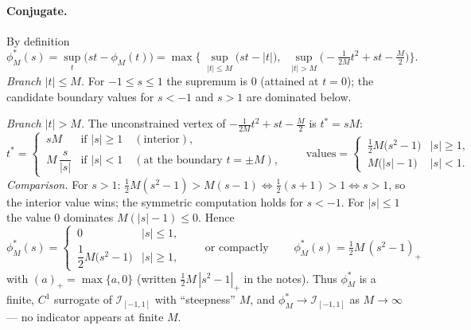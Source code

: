 \documentclass{article}
\newcommand{\pospart}[1]{\left(#1\right)_{+}}
\begin{document}
\paragraph{Conjugate.} By definition
$$
\phi_M^{*}(s)=\sup_t\big(st-\phi_M(t)\big)
=\max\Big\{\;\sup_{|t|\le M}\big(st-|t|\big),\;\;
\sup_{|t|> M}\big(-\tfrac{1}{2M}t^{2}+st-\tfrac{M}{2}\big)\Big\}.
$$
\emph{Branch $|t|\le M$.} For $-1\le s\le 1$ the supremum is $0$ (attained at $t=0$);
the candidate boundary values for $s<-1$ and $s>1$ are dominated below.

\emph{Branch $|t|> M$.} The unconstrained vertex of $-\tfrac{1}{2M}t^{2}+st-\tfrac{M}{2}$ is $t^{*}=sM$:
$$
t^{*}=
\begin{cases}
\,sM & \text{if } |s|\ge 1 \quad(\text{interior}),\\[2pt]
\,M\,\dfrac{s}{|s|} & \text{if } |s|< 1 \quad(\text{at the boundary } t=\pm M),
\end{cases}
\qquad
\text{values}=
\begin{cases}
\,\tfrac{1}{2}M\big(s^{2}-1\big) & |s|\ge 1,\\[4pt]
\,M\big(|s|-1\big) & |s|< 1.
\end{cases}
$$
\emph{Comparison.} For $s>1$: $\tfrac{1}{2}M(s^{2}-1)>M(s-1)\iff \tfrac{1}{2}(s+1)>1\iff s>1$, so the interior value wins;
the symmetric computation holds for $s<-1$. For $|s|\le 1$ the value $0$ dominates $M(|s|-1)\le 0$. Hence
$$
\phi_M^{*}(s)=
\begin{cases}
\,0 & |s|\le 1,\\[4pt]
\,\dfrac{1}{2}M\big(s^{2}-1\big) & |s|\ge 1,
\end{cases}
\qquad\text{or compactly}\qquad
\boxed{\;\phi_M^{*}(s)=\tfrac{1}{2}M\,\pospart{s^{2}-1}\;}
$$
with $\pospart{a}=\max\{a,0\}$ (written $\tfrac{1}{2}M\,|s^{2}-1|_{+}$ in the notes).
Thus $\phi_M^{*}$ is a finite, $C^{1}$ surrogate of $\mathcal{I}_{[-1,1]}$ with ``steepness'' $M$,
and $\phi_M^{*}\to\mathcal{I}_{[-1,1]}$ as $M\to\infty$ --- no indicator appears at finite $M$.
\end{document}
